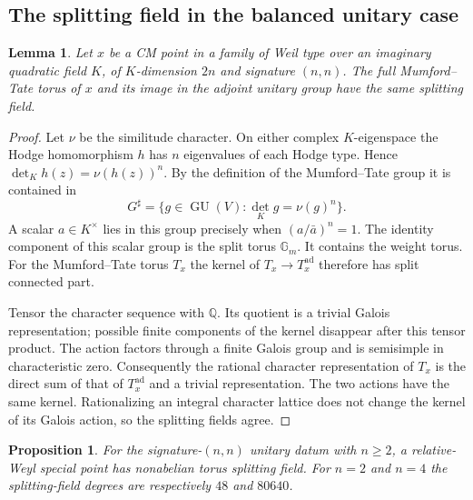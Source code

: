 \documentclass[11pt]{article}
\newtheorem{proposition}[theorem]{Proposition}
\newtheorem{lemma}[theorem]{Lemma}
\theoremstyle{definition}
\theoremstyle{remark}
\begin{document}
\subsection{The splitting field in the balanced unitary case}

\begin{lemma}\label{lem:balanced-splitting-field}
Let $x$ be a CM point in a family of Weil type over an imaginary
quadratic field $K$, of $K$-dimension $2n$ and signature $(n,n)$.
The full Mumford--Tate torus of $x$ and its image in the adjoint
unitary group have the same splitting field.
\end{lemma}

\begin{proof}
Let $\nu$ be the similitude character.  On either complex
$K$-eigenspace the Hodge homomorphism $h$ has $n$ eigenvalues of
each Hodge type.  Hence
$\det_Kh(z)=\nu(h(z))^n$.  By the definition of the
Mumford--Tate group it is contained in
\[
 G^\sharp=\{g\in\operatorname{GU}(V):\det_Kg=\nu(g)^n\}.
\]
A scalar $a\in K^\times$ lies in this group precisely when
$(a/\bar a)^n=1$.  The identity component of this scalar group is
the split torus $\mathbb G_m$.  It contains the weight torus.
For the Mumford--Tate torus $T_x$ the kernel of
$T_x\to T_x^{\mathrm{ad}}$ therefore has split connected part.

Tensor the character sequence with $\mathbb Q$.  Its quotient is
a trivial Galois representation; possible finite components of
the kernel disappear after this tensor product.  The action factors
through a finite Galois group and is semisimple in characteristic
zero.  Consequently the rational character representation of $T_x$
is the direct sum of that of $T_x^{\mathrm{ad}}$ and a trivial
representation.  The two actions have the same kernel.  Rationalizing
an integral character lattice does not change the kernel of its
Galois action, so the splitting fields agree.
\end{proof}

\begin{proposition}\label{prop:no-abelian-weyl}
For the signature-$(n,n)$ unitary datum with $n\geq2$, a
relative-Weyl special point has nonabelian torus splitting field.
For $n=2$ and $n=4$ the splitting-field degrees are respectively
$48$ and $80640$.
\end{proposition}
\end{document}
